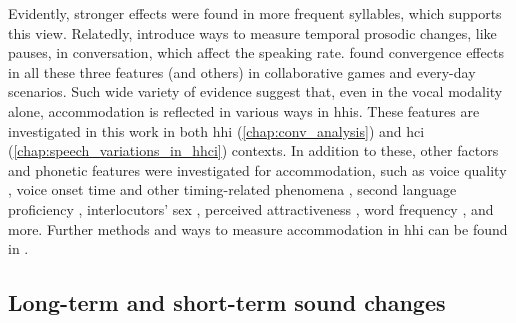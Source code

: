 Evidently, stronger effects were found in more frequent syllables, which supports this view.
Relatedly, \citet{Edlund2009pause, Xiao2015analyzing, Cohen2017converging} introduce ways to measure temporal prosodic changes, like pauses, in conversation, which affect the speaking rate.
\citet{Levitan2011measuring, Local2007phonetic} found convergence effects in all these three features (and others) in collaborative games and every-day scenarios.
Such wide variety of evidence suggest that, even in the vocal modality alone, accommodation is reflected in various ways in \acp{hhi}.
These features are investigated in this work in both \ac{hhi} (\cref{chap:conv_analysis}) and \ac{hci} (\cref{chap:speech_variations_in_hhci}) contexts.
In addition to these, other factors and phonetic features were investigated for accommodation, such as voice quality \citep{Borrie2017conversational}, voice onset time \citep{Nielsen2011specificity} and other timing-related phenomena \citep{Putman1984conception}, second language proficiency \citep{Law2020convergence}, interlocutors' sex \citep{Levitan2012acoustic, Bailly2014assessing}, perceived attractiveness \citep{Michalsky2017pitch}, word frequency \citep{Nenkova2008high}, and more.
Further methods and ways to measure accommodation in \ac{hhi} can be found in \citet{Lewandowski2019phonetic, DeLooze2014investigating}.

\subsection{Long-term and short-term sound changes}
\label{subsec:sound_change}

